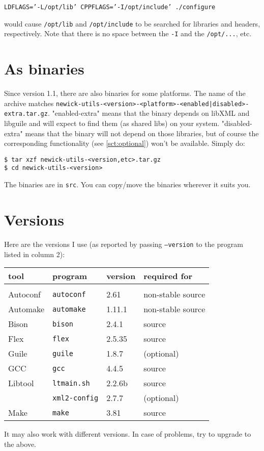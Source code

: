 \texttt{LDFLAGS='-L/opt/lib' CPPFLAGS='-I/opt/include' ./configure}

would cause \texttt{/opt/lib} and \texttt{/opt/include} to be searched for
libraries and headers, respectively. Note that there is no space between the
\texttt{-I} and the \texttt{/opt/...}, etc.

\section{As binaries}

Since version 1.1, there are also binaries for some platforms. The name of the
archive matches
\texttt{newick-utils-<version>-<platform>-<enabled|disabled>-extra.tar.gz}.
"enabled-extra" means that the binary depends on libXML and libguile and will
expect to find them (as shared libs) on your system. "disabled-extra" means that
the binary will not depend on those libraries, but of course the corresponding
functionality (see \ref{sct:optional}) won't be available. Simply do:

\begin{verbatim}
$ tar xzf newick-utils-<version,etc>.tar.gz
$ cd newick-utils-<version>
\end{verbatim}

\noindent{}The binaries are in \texttt{src}. You can copy/move the binaries
wherever it suits you.

\section{Versions}
\label{sct:versions}

\noindent{}Here are the versions I use (as reported by passing
\texttt{--version} to the program listed in column 2):

\begin{tabular}{llll}
\textbf{tool}	& \textbf{program} & \textbf{version} & \textbf{required for} \\
\hline \\
\gnu{} Autoconf	& \texttt{autoconf}	  	& 2.61 		& non-stable source \\
\gnu{} Automake	& \texttt{automake} 	 	& 1.11.1	& non-stable source \\
\gnu{} Bison 		& \texttt{bison}  			& 2.4.1 	& source \\ 
Flex						& \texttt{flex} 				& 2.5.35 	& source \\
\gnu{} Guile		& \texttt{guile}				& 1.8.7 	& (optional) \\
GCC 						& \texttt{gcc}  				& 4.4.5 	& source \\
\gnu{} Libtool	& \texttt{ltmain.sh}  	& 2.2.6b 	& source \\
\libxml{}				& \texttt{xml2-config}	& 2.7.7 	& (optional) \\ 
\gnu{} Make			& \texttt{make}			 		& 3.81		& source \\
\end{tabular}

\medskip{}
\noindent{}It may also work with different versions. In case of problems, try to
upgrade to the above.
